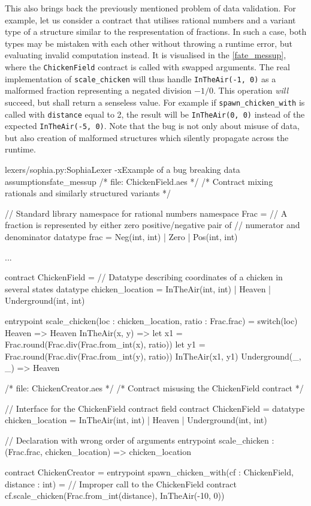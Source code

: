 This also brings back the previously mentioned problem of data validation. For
example, let us consider a contract that utilises rational numbers and a variant
type of a structure similar to the respresentation of fractions. In such a case,
both types may be mistaken with each other without throwing a runtime error, but
evaluating invalid computation instead. It is visualised in the
\autoref{fate_messup}, where the \texttt{ChickenField} contract is called with
swapped arguments. The real implementation of \texttt{scale\_chicken} will thus
handle \texttt{InTheAir(-1, 0)} as a malformed fraction representing a negated
division $-1/0$. This operation \emph{will} succeed, but shall return a
senseless value. For example if \texttt{spawn\_chicken\_with} is called with
\texttt{distance} equal to 2, the result will be \texttt{InTheAir(0, 0)} instead
of the expected \texttt{InTheAir(-5, 0)}. Note that the bug is not only about
misuse of data, but also creation of malformed structures which silently
propagate across the runtime.

\begin{code}[hb]{lexers/sophia.py:SophiaLexer -x}{Example of a bug breaking data
    assumptions}{fate_messup}
/* file: ChickenField.aes                                                     */
/* Contract mixing rationals and similarly structured variants                */

// Standard library namespace for rational numbers
namespace Frac =
  // A fraction is represented by either zero positive/negative pair of
  // numerator and denominator
  datatype frac = Neg(int, int) | Zero | Pos(int, int)

  ...

contract ChickenField =
  // Datatype describing coordinates of a chicken in several states
  datatype chicken_location = InTheAir(int, int) | Heaven | Underground(int, int)

  entrypoint scale_chicken(loc : chicken_location, ratio : Frac.frac) =
    switch(loc)
      Heaven => Heaven
      InTheAir(x, y) =>
        let x1 = Frac.round(Frac.div(Frac.from_int(x), ratio))
        let y1 = Frac.round(Frac.div(Frac.from_int(y), ratio))
        InTheAir(x1, y1)
      Underground(_, _) => Heaven


/* file: ChickenCreator.aes                                                   */
/* Contract misusing the ChickenField contract                                */

// Interface for the ChickenField contract field
contract ChickenField =
  datatype chicken_location = InTheAir(int, int) | Heaven | Underground(int, int)

  // Declaration with wrong order of arguments
  entrypoint scale_chicken : (Frac.frac, chicken_location) => chicken_location

contract ChickenCreator =
  entrypoint spawn_chicken_with(cf : ChickenField, distance : int) =
    // Improper call to the ChickenField contract
    cf.scale_chicken(Frac.from_int(distance), InTheAir(-10, 0))
\end{code}
